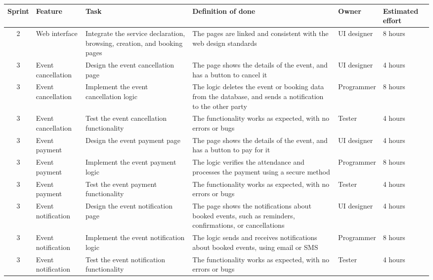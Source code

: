 \documentclass[a4paper,12pt]{article}
\begin{document}
\newpage\noindent
\begin{landscape}
\begin{table}[!h]
\centering
\begin{tabular}{|c|l|p{7cm}|p{6cm}|l|p{2cm}|}
\hline
\textbf{Sprint} & \textbf{Feature} & \textbf{Task} & \textbf{Definition of done} & \textbf{Owner} & \textbf{Estimated effort} \\
\hline
2 & Web interface & Integrate the service declaration, browsing, creation, and booking pages & The pages are linked and consistent with the web design standards & UI designer & 8 hours \\
\hline
3 & Event cancellation & Design the event cancellation page & The page shows the details of the event, and has a button to cancel it & UI designer & 4 hours \\
\hline
3 & Event cancellation & Implement the event cancellation logic & The logic deletes the event or booking data from the database, and sends a notification to the other party & Programmer & 8 hours \\
\hline
3 & Event cancellation & Test the event cancellation functionality & The functionality works as expected, with no errors or bugs & Tester & 4 hours \\
\hline
3 & Event payment & Design the event payment page & The page shows the details of the event, and has a button to pay for it & UI designer & 4 hours \\
\hline
3 & Event payment & Implement the event payment logic & The logic verifies the attendance and processes the payment using a secure method & Programmer & 8 hours \\
\hline
3 & Event payment & Test the event payment functionality & The functionality works as expected, with no errors or bugs & Tester & 4 hours \\
\hline
3 & Event notification & Design the event notification page & The page shows the notifications about booked events, such as reminders, confirmations, or cancellations & UI designer & 4 hours \\
\hline
3 & Event notification & Implement the event notification logic & The logic sends and receives notifications about booked events, using email or SMS & Programmer & 8 hours \\
\hline
3 & Event notification & Test the event notification functionality & The functionality works as expected, with no errors or bugs & Tester & 4 hours \\
\hline
\end{tabular}
\end{table}
\end{landscape}
\end{document}
